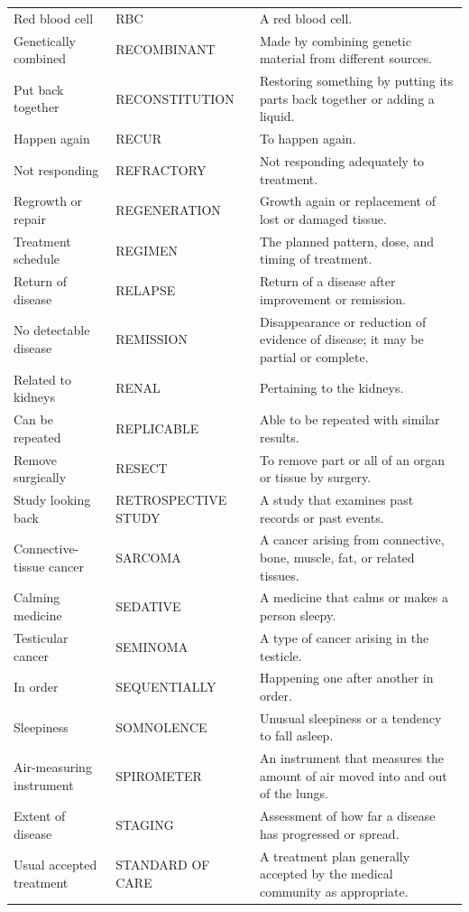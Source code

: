 \begin{longtable}{>{\raggedright\arraybackslash}p{} >{\raggedright\arraybackslash}p{} >{\raggedright\arraybackslash}p{}}
Red blood cell & RBC & A red blood cell. \\
Genetically combined & RECOMBINANT & Made by combining genetic material from different sources. \\
Put back together & RECONSTITUTION & Restoring something by putting its parts back together or adding a liquid. \\
Happen again & RECUR & To happen again. \\
Not responding & REFRACTORY & Not responding adequately to treatment. \\
Regrowth or repair & REGENERATION & Growth again or replacement of lost or damaged tissue. \\
Treatment schedule & REGIMEN & The planned pattern, dose, and timing of treatment. \\
Return of disease & RELAPSE & Return of a disease after improvement or remission. \\
No detectable disease & REMISSION & Disappearance or reduction of evidence of disease; it may be partial or complete. \\
Related to kidneys & RENAL & Pertaining to the kidneys. \\
Can be repeated & REPLICABLE & Able to be repeated with similar results. \\
Remove surgically & RESECT & To remove part or all of an organ or tissue by surgery. \\
Study looking back & RETROSPECTIVE STUDY & A study that examines past records or past events. \\
Connective-tissue cancer & SARCOMA & A cancer arising from connective, bone, muscle, fat, or related tissues. \\
Calming medicine & SEDATIVE & A medicine that calms or makes a person sleepy. \\
Testicular cancer & SEMINOMA & A type of cancer arising in the testicle. \\
In order & SEQUENTIALLY & Happening one after another in order. \\
Sleepiness & SOMNOLENCE & Unusual sleepiness or a tendency to fall asleep. \\
Air-measuring instrument & SPIROMETER & An instrument that measures the amount of air moved into and out of the lungs. \\
Extent of disease & STAGING & Assessment of how far a disease has progressed or spread. \\
Usual accepted treatment & STANDARD OF CARE & A treatment plan generally accepted by the medical community as appropriate. \\

\end{longtable}

